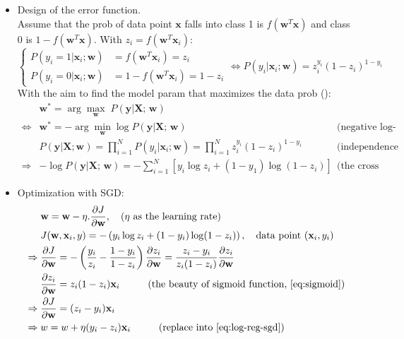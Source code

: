\begin{itemize}
	\item Design of the error function.\\
	Assume that the \ac{prob} of data point $\textbf{x}$ falls into class 1 is $f(\textbf{w}^T\textbf{x})$ and class 0 is $1-f(\textbf{w}^T\textbf{x})$. With $z_i = f(\textbf{w}^T\textbf{x}_i)$:
	\begin{equation}
		\begin{cases}
			P(y_i=1|\textbf{x}_i; \textbf{w}) &= f(\textbf{w}^T\textbf{x}_i) = z_i \\
			P(y_i=0|\textbf{x}_i; \textbf{w}) &= 1 - f(\textbf{w}^T\textbf{x}_i) =1 - z_i
		\end{cases} \Leftrightarrow P(y_i | \textbf{x}_i; \textbf{w}) = z_i^{y_i}(1-z_i)^{1-y_i}
	\end{equation}
	With the aim to find the model \ac{param} that maximizes the data \ac{prob} ():
	\begin{align*}
		& \textbf{w}^* = \arg \underset{\textbf{w}}{\max}\;P(\textbf{y}|\textbf{X; w}) && \\
		\iff & \textbf{w}^* = - \arg \underset{\textbf{w}}{\min} \log P(\textbf{y}|\textbf{X; w}) && \text{(negative log-likelihood)} \\
		& P(\mathbf{y}|\mathbf{X}; \mathbf{w}) = \prod_{i=1}^N P(y_i| \mathbf{x}_i; \mathbf{w}) = \prod_{i=1}^N z_i^{y_i}(1 - z_i)^{1- y_i} && \text{(independence assumption)} \\
		\Rightarrow & - \log P(\textbf{y}|\textbf{X; w}) = - \sum_{i=1}^{N} [ y_i\log z_i + (1-y_1)\log (1-z_i) ] && \text{(the cross entropy error)}
	\end{align*}
	
	\item Optimization with \ac{SGD}:
	\begin{align}
		& \textbf{w} = \textbf{w} - \eta.\frac{\partial J}{\partial \textbf{w}}, \quad \text{($\eta$ as the learning rate)}
		\label{eq:log-reg-sgd}\\			
		& J(\textbf{w}, \textbf{x}_i, y) = -\left( y_i\log z_i + (1-y_i)\log(1-z_i) \right), \quad \text{data point $(\textbf{x}_i, y_i)$} \\
		\Rightarrow \; &\frac{\partial J}{\partial \textbf{w}} = - \left( \frac{y_i}{z_i} - \frac{1-y_i}{1-z_i} \right) \frac{\partial z_i}{\partial\textbf{w}} = \frac{z_i - y_i}{z_i(1-z_i)} \frac{\partial z_i}{\partial\textbf{w}} \\
		& \frac{\partial z_i}{\partial \textbf{w}} = z_i(1-z_i) \textbf{x}_i \tab \text{(the beauty of sigmoid function, \eqref{eq:sigmoid})} \\
		\Rightarrow \; &\frac{\partial J}{\partial \textbf{w}} = (z_i - y_i) \textbf{x}_i\\
		\Rightarrow \; &w = w + \eta (y_i - z_i) \textbf{x}_i \tab \text{(replace into \eqref{eq:log-reg-sgd})}
	\end{align}
\end{itemize}

